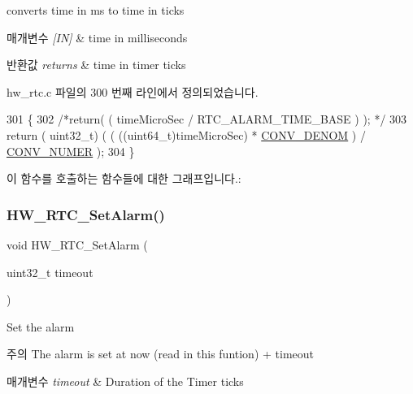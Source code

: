 converts time in ms to time in ticks 


\begin{DoxyParams}{매개변수}
{\em \mbox{[}\+I\+N\mbox{]}} & time in milliseconds \\
\hline
\end{DoxyParams}

\begin{DoxyRetVals}{반환값}
{\em returns} & time in timer ticks \\
\hline
\end{DoxyRetVals}


hw\+\_\+rtc.\+c 파일의 300 번째 라인에서 정의되었습니다.


\begin{DoxyCode}
301 \{
302 \textcolor{comment}{/*return( ( timeMicroSec / RTC\_ALARM\_TIME\_BASE ) ); */}
303   \textcolor{keywordflow}{return} ( uint32\_t) ( ( ((uint64\_t)timeMicroSec) * \mbox{\hyperlink{hw__rtc_8c_a661badebd0364de871f2cd2d0b185c55}{CONV\_DENOM}} ) / 
      \mbox{\hyperlink{hw__rtc_8c_a8dbad53513ea56467eac68d23a1baf49}{CONV\_NUMER}} );
304 \}
\end{DoxyCode}
이 함수를 호출하는 함수들에 대한 그래프입니다.\+:
\mbox{\label{group___lory_s_d_k___r_t_c___functions_ga09cec56d54c13de658fafdd003390771}} 
\subsubsection{\texorpdfstring{H\+W\+\_\+\+R\+T\+C\+\_\+\+Set\+Alarm()}{HW\_RTC\_SetAlarm()}}
{\footnotesize\ttfamily void H\+W\+\_\+\+R\+T\+C\+\_\+\+Set\+Alarm (\begin{DoxyParamCaption}\item[{uint32\+\_\+t}]{timeout }\end{DoxyParamCaption})}



Set the alarm 

\begin{DoxyNote}{주의}
The alarm is set at now (read in this funtion) + timeout 
\end{DoxyNote}

\begin{DoxyParams}{매개변수}
{\em timeout} & Duration of the Timer ticks \\
\hline
\end{DoxyParams}


